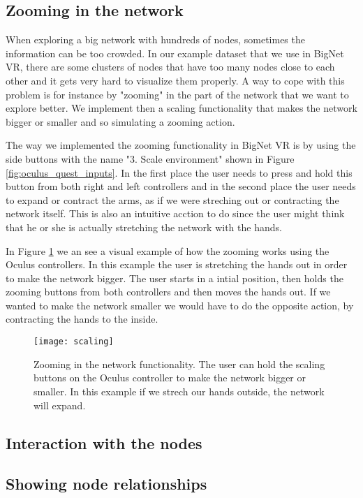 \subsection{Zooming in the network}
When exploring a big network with hundreds of nodes, sometimes the information can be too crowded. In our example dataset that we use in BigNet VR, there are some clusters of nodes that have too many nodes close to each other and it gets very hard to visualize them properly. A way to cope with this problem is for instance by "zooming" in the part of the network that we want to explore better. We implement then a scaling functionality that makes the network bigger or smaller and so simulating a zooming action.

The way we implemented the zooming functionality in BigNet VR is by using the side buttons with the name "3. Scale environment" shown in Figure \ref{fig:oculus_quest_inputs}. In the first place the user needs to press and hold this button from both right and left controllers and in the second place the user needs to expand or contract the arms, as if we were streching out or contracting the network itself. This is also an intuitive acction to do since the user might think that he or she is actually stretching the network with the hands.

In Figure \ref{fig:scaling} we an see a visual example of how the zooming works using the Oculus controllers. In this example the user is stretching the hands out in order to make the network bigger. The user starts in a intial position, then holds the zooming buttons from both controllers and then moves the hands out. If we wanted to make the network smaller we would have to do the opposite action, by contracting the hands to the inside.

\begin{figure}[h!]
    \centering%
    \texttt{[image: scaling]}
    \caption{Zooming in the network functionality. The user can hold the scaling buttons on the Oculus controller to make the network bigger or smaller. In this example if we strech our hands outside, the network will expand.}
    \label{fig:scaling}
\end{figure}%

\subsection{Interaction with the nodes}

\subsection{Showing node relationships}

